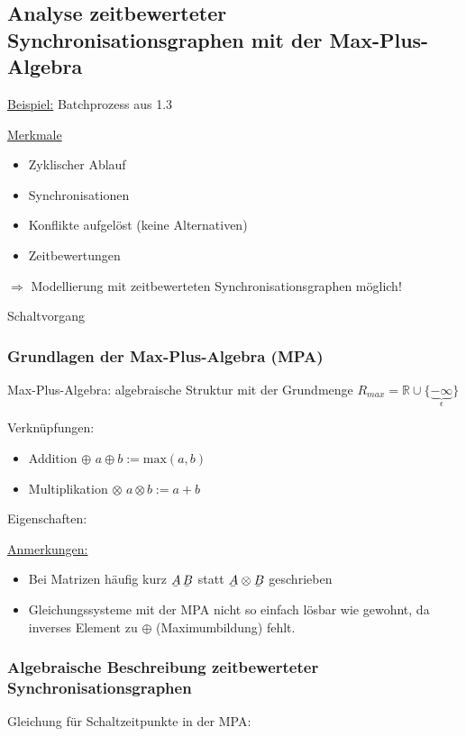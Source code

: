 \subsection{Analyse zeitbewerteter Synchronisationsgraphen mit der Max-Plus-Algebra}
\underline{Beispiel:} Batchprozess aus 1.3


\underline{Merkmale}
\begin{itemize}
	\item Zyklischer Ablauf
	\item Synchronisationen
	\item Konflikte aufgelöst (keine Alternativen)
	\item Zeitbewertungen
\end{itemize}

$\Rightarrow$ Modellierung mit zeitbewerteten Synchronisationsgraphen möglich!

Schaltvorgang 

\subsubsection{Grundlagen der Max-Plus-Algebra (MPA)}
Max-Plus-Algebra: algebraische Struktur mit der Grundmenge $R_{max}=\mathbb{R} \cup \{\underbrace{-\infty}_{\epsilon}\}$

Verknüpfungen:
\begin{itemize}
	\item Addition $\oplus$
		$a \oplus b := \text{max}(a,b)$
	\item Multiplikation $\otimes$
		$a \otimes b := a + b$
\end{itemize}

Eigenschaften: 

\underline{Anmerkungen:}
\begin{itemize}
	\item Bei Matrizen häufig kurz $\ubar{A} \, \ubar{B}$ statt $\ubar{A} \otimes \ubar{B}$ geschrieben
	\item Gleichungssysteme mit der MPA nicht so einfach lösbar wie gewohnt, da inverses Element zu $\oplus$ (Maximumbildung) fehlt.
\end{itemize}

\subsubsection{Algebraische Beschreibung zeitbewerteter Synchronisationsgraphen}
Gleichung für Schaltzeitpunkte in der MPA: 

